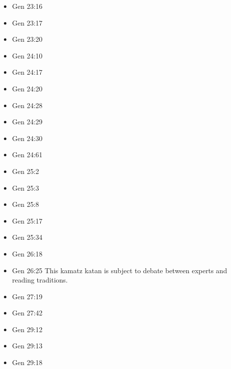 \documentclass[14pt]{article}
\begin{document}
\begin{multicols}{2}
\begin{itemize}
\item Gen 23:16

\item Gen 23:17

\item Gen 23:20

\item Gen 24:10

\item Gen 24:17

\item Gen 24:20

\item Gen 24:28

\item Gen 24:29

\item Gen 24:30

\item Gen 24:61

\item Gen 25:2

\item Gen 25:3

\item Gen 25:8

\item Gen 25:17

\item Gen 25:34

\item Gen 26:18

\item Gen 26:25 This kamatz katan is subject to debate between experts and reading traditions.

\item Gen 27:19

\item Gen 27:42

\item Gen 29:12

\item Gen 29:13

\item Gen 29:18


\end{itemize}
\end{multicols}
\end{document}
